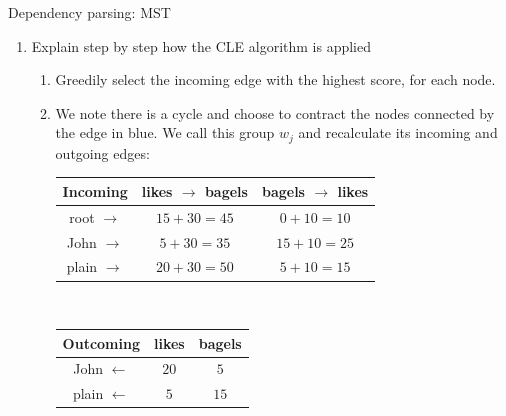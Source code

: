 \documentclass[12pt]{article}
\newenvironment{exercise}[2][Exercise]{\begin{trivlist}
\item[\hskip \labelsep {\bfseries #1}\hskip \labelsep {\bfseries #2.}]}{\end{trivlist}}
\begin{document}
\begin{exercise}{4} Dependency parsing: MST	
\begin{enumerate}[label=(\alph*)]

\item Explain step by step how the CLE algorithm is applied
\begin{enumerate}
\item Greedily select the incoming edge with the highest score, for each node.


\item We note there is a cycle and choose to contract the nodes connected by the edge in blue. We call this group $w_j$ and recalculate its incoming and outgoing edges: \\

\begin{tabular}{|c|c|c|}
\hline
\textbf{Incoming} & likes $\rightarrow$ bagels & bagels $\rightarrow$ likes \\ \hline
root $\rightarrow$ & {\color{red}$15+30 = 45$} & $0+10 = 10$ \\ \hline
John $\rightarrow$ & {\color{red}$5+30 = 35$} & $15+10 = 25$ \\ \hline
plain $\rightarrow$ & {\color{red}$20+30 = 50$} & $5+10 = 15$ \\ \hline 
\end{tabular} \\

\begin{tabular}{|c|c|c|}
\hline
\textbf{Outcoming} & likes & bagels \\ \hline
John $\leftarrow$ & {\color{red}$20$} & $5$ \\ \hline
plain $\leftarrow$ & $5$ & {\color{red}$15$} \\ \hline
\end{tabular} \\


\end{enumerate}
\end{enumerate}
\end{exercise}
\end{document}
